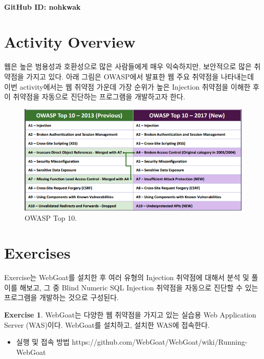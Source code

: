 \documentclass[a4paper, 11pt]{article}
\theoremstyle{definition}
\newtheorem{exercise}{Exercise}
\begin{document}
 \\
         {\phantom{} \hfill \textbf{GitHub ID: nohkwak}} \\

\section{Activity Overview}
웹은 높은 범용성과 호환성으로 많은 사람들에게 매우 익숙하지만, 보안적으로 많은 취약점을 가지고 있다. 
아래 그림은 OWASP에서 발표한 웹 주요 취약점\cite{owasp}을 나타내는데 
이번 activity에서는 웹 취약점 가운데 가장 순위가 높은 Injection 취약점을 이해한 후 이 취약점을 자동으로 진단하는 프로그램을 개발하고자 한다. 

\begin{figure}[h]
  \includegraphics[width=\linewidth]{owasptop.png}
  \caption{OWASP Top 10.}
  \label{fig:owasp}
\end{figure}

\section{Exercises}

Exercise는 WebGoat\cite{webgoat}를 설치한 후 여러 유형의 Injection 취약점에 대해서 분석 및 풀이를 해보고,
그 중 Blind Numeric SQL Injection 취약점을 자동으로 진단할 수 있는 프로그램을 개발하는 것으로 구성된다. 

\begin{exercise}

WebGoat는 다양한 웹 취약점을 가지고 있는 실습용 Web Application Server (WAS)이다. 
WebGoat를 설치하고, 설치한 WAS에 접속한다. 

\begin{itemize}
  \item 실행 및 접속 방법 https://github.com/WebGoat/WebGoat/wiki/Running-WebGoat  
\end{itemize}

\end{exercise}
\end{document}
